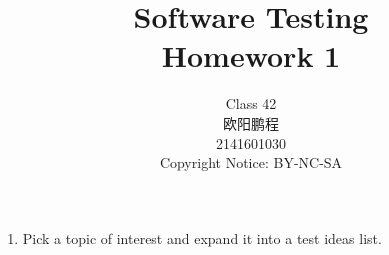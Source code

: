 \documentclass{article}
\title{Software Testing \\ Homework 1}
\author{Class 42 \\ 欧阳鹏程 \\ 2141601030 \\ Copyright Notice: BY-NC-SA}
\begin{document}
\maketitle
\begin{enumerate}
	\item Pick a topic of interest and expand it into a test ideas list.
	
\end{enumerate}
\end{document}

